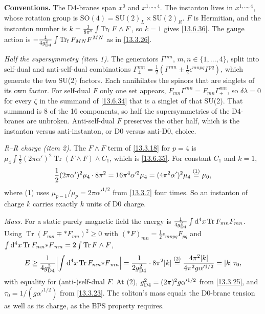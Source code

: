 \begin{tcolorbox}[breakable]
	\begin{remark}
		\textbf{Conventions.} The D4-branes span $x^0$ and $x^{1,\dots,4}$. The instanton lives in $x^{1,\dots,4}$, whose rotation group is $\mathrm{SO}(4)=\mathrm{SU}(2)_L\times\mathrm{SU}(2)_R$. $F$ is Hermitian, and the instanton number is $k=\frac1{8\pi^2}\int\operatorname{Tr}_{\rm f}F\wedge F$, so $k=1$ gives \eqref{13.6.36}. The gauge action is $-\frac{1}{4g_{\rm D4}^2}\int\operatorname{Tr}_{\rm f}F_{MN}F^{MN}$ as in \eqref{13.3.26}.

		\textit{Half the supersymmetry (item 1).} The generators $\Gamma^{mn}$, $m,n\in\{1,\dots,4\}$, split into self-dual and anti-self-dual combinations $\Gamma^{mn}_\pm=\frac12(\Gamma^{mn}\pm\frac12\epsilon^{mnpq}\Gamma^{pq})$, which generate the two SU(2) factors. Each annihilates the spinors that are singlets of its own factor. For self-dual $F$ only one set appears, $F_{mn}\Gamma^{mn}=F_{mn}\Gamma^{mn}_+$, so $\delta\lambda=0$ for every $\zeta$ in the summand of \eqref{13.6.34} that is a singlet of that SU(2). That summand is 8 of the 16 components, so half the supersymmetries of the D4-branes are unbroken. Anti-self-dual $F$ preserves the other half, which is the instanton versus anti-instanton, or D0 versus anti-D0, choice.

		\textit{R--R charge (item 2).} The $F\wedge F$ term of \eqref{13.3.18} for $p=4$ is $\mu_4\int\frac12(2\pi\alpha')^2\operatorname{Tr}(F\wedge F)\wedge C_1$, which is \eqref{13.6.35}. For constant $C_1$ and $k=1$,
		\begin{equation*}
			\frac12(2\pi\alpha')^2\mu_4\cdot8\pi^2 = 16\pi^4\alpha'^2\mu_4 = (4\pi^2\alpha')^2\mu_4 \overset{(1)}{=} \mu_0 ,
		\end{equation*}
		where (1) uses $\mu_{p-1}/\mu_p=2\pi\alpha'^{1/2}$ from \eqref{13.3.7} four times. So an instanton of charge $k$ carries exactly $k$ units of D0 charge.

		\textit{Mass.} For a static purely magnetic field the energy is $\frac1{4g_{\rm D4}^2}\int\mathrm{d}^4x\operatorname{Tr}F_{mn}F_{mn}$. Using $\operatorname{Tr}(F_{mn}\mp{*F}_{mn})^2\ge0$ with $({*F})_{mn}=\frac12\epsilon_{mnpq}F_{pq}$ and $\int\mathrm{d}^4x\operatorname{Tr}F_{mn}{*F}_{mn}=2\int\operatorname{Tr}F\wedge F$,
		\begin{equation*}
			E \ge \frac{1}{4g_{\rm D4}^2}\Bigl|\int\mathrm{d}^4x\operatorname{Tr}F_{mn}{*F}_{mn}\Bigr| = \frac{1}{2g_{\rm D4}^2}\cdot8\pi^2|k| \overset{(2)}{=} \frac{4\pi^2|k|}{4\pi^2g\alpha'^{1/2}} = |k|\,\tau_0 ,
		\end{equation*}
		with equality for (anti-)self-dual $F$. At (2), $g_{\rm D4}^2=(2\pi)^2g\alpha'^{1/2}$ from \eqref{13.3.25}, and $\tau_0=1/(g\alpha'^{1/2})$ from \eqref{13.3.23}. The soliton's mass equals the D0-brane tension as well as its charge, as the BPS property requires.
	\end{remark}
\end{tcolorbox}

